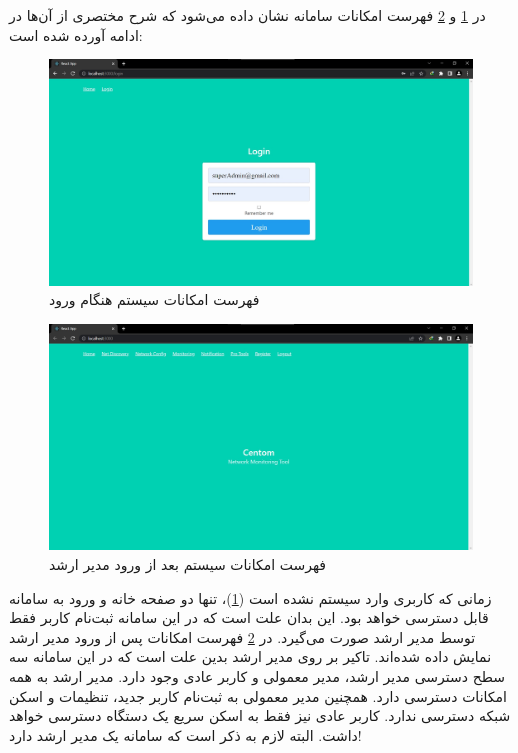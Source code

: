 در \cref{fig.12} و \cref{fig.13} فهرست امکانات سامانه نشان داده می‌شود که شرح مختصری از آن‌ها در ادامه آورده شده است:


\begin{figure}[!h]
    \centering\includegraphics[scale=.38]{./nav-logout}
    \caption{فهرست امکانات سیستم هنگام ورود}\label{fig.12}
\end{figure}

\begin{figure}[!h]
    \centering\includegraphics[scale=.38]{./nav-login}
    \caption{فهرست امکانات سیستم بعد از ورود مدیر ارشد}\label{fig.13}
\end{figure}
        
زمانی که کاربری وارد سیستم نشده است (\cref{fig.12})، تنها دو صفحه خانه و ورود به سامانه قابل دسترسی خواهد بود. این بدان علت است که در این سامانه ثبت‌نام کاربر فقط توسط مدیر ارشد صورت می‌گیرد. در \cref{fig.13} فهرست امکانات پس از ورود مدیر ارشد نمایش داده شده‌اند. تاکیر بر روی مدیر ارشد بدین علت است که در این سامانه سه سطح دسترسی مدیر ارشد، مدیر معمولی و کاربر عادی وجود دارد. مدیر ارشد به همه امکانات دسترسی دارد. همچنین مدیر معمولی به ثبت‌نام کاربر جدید، تنظیمات و اسکن شبکه دسترسی ندارد. کاربر عادی نیز فقط به اسکن سریع یک دستگاه دسترسی خواهد داشت. البته لازم به ذکر است که سامانه یک مدیر ارشد دارد!


